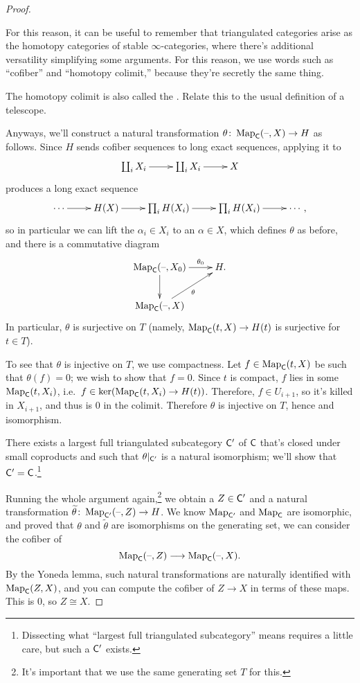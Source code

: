 \begin{proof}
\begin{rem}
For this reason, it can be useful to remember that triangulated categories arise as the homotopy categories of
stable $\infty$-categories, where there's additional versatility simplifying some arguments. For this reason, we
use words such as ``cofiber'' and ``homotopy colimit,'' because they're secretly the same thing. %
\end{rem}
\begin{ex}
The homotopy colimit is also called the . Relate this to the usual definition of a telescope.
\end{ex}
Anyways, we'll construct a natural transformation $\theta\colon\operatorname{Map}_\mathsf C(\text{--},X)\to H$ as follows. Since $H$ sends
cofiber sequences to long exact sequences, applying it to
\[\xymatrix{
	\coprod_i X_i\ar[r] & \coprod_i X_i\ar[r] & X
}\]
produces a long exact sequence
\[\xymatrix{
	\dotsb\ar[r] & H(X)\ar[r] & \prod_i H(X_i)\ar[r] & \prod_i H(X_i)\ar[r] & \dotsb,
}\]
so in particular we can lift the $\alpha_i\in X_i$ to an $\alpha\in X$, which defines $\theta$ as before, and there
is a commutative diagram
\[\xymatrix{
	\Map_\fC(\bl,X_0)\ar[r]^-{\theta_0}\ar[d] & H.\\
	\Map_\fC(\bl,X)\ar[ur]_{\theta}
}\]
In particular, $\theta$ is surjective on $T$ (namely, $\operatorname{Map}_\mathsf C(t,X)\to H(t)$ is surjective for $t\in T$).

To see that $\theta$ is injective on $T$, we use compactness. Let $f\in\operatorname{Map}_\mathsf C(t,X)$ be such that $\theta(f) = 0$;
we wish to show that $f = 0$. Since $t$ is compact, $f$ lies in some $\operatorname{Map}_\mathsf C(t,X_i)$, i.e.\
$f\in\ker(\operatorname{Map}_\mathsf C(t,X_i)\to H(t))$. Therefore, $f\in U_{i+1}$, so it's killed in $X_{i+1}$, and thus is $0$ in the
colimit. Therefore $\theta$ is injective on $T$, hence and isomorphism.

There exists a largest full triangulated subcategory $\mathsf C'$ of $\mathsf C$ that's closed under small coproducts
and such that $\theta|_{\mathsf C'}$ is a natural isomorphism; we'll show that $\mathsf C' =
\mathsf C$.\footnote{Dissecting what ``largest full triangulated subcategory'' means requires a little care, but such a
$\mathsf C'$ exists.}

Running the whole argument again,\footnote{It's important that we use the same generating set $T$ for this.} we
obtain a $Z\in\mathsf C'$ and a natural transformation $\widetilde\theta\colon\operatorname{Map}_{\mathsf C'}(\text{--},Z)\to H$.  We know
$\operatorname{Map}_{\mathsf C'}$ and $\operatorname{Map}_\mathsf C$ are isomorphic, and proved that $\theta$ and $\widetilde\theta$ are isomorphisms on
the generating set, we can consider the cofiber of
\[\operatorname{Map}_\mathsf C(\text{--},Z)\longrightarrow\operatorname{Map}_\mathsf C(\text{--},X).\]
By the Yoneda lemma, such natural transformations are naturally identified with $\operatorname{Map}_\mathsf C(Z,X)$, and you can
compute the cofiber of $Z\to X$ in terms of these maps. This is $0$, so $Z\cong X$.


\end{proof}
